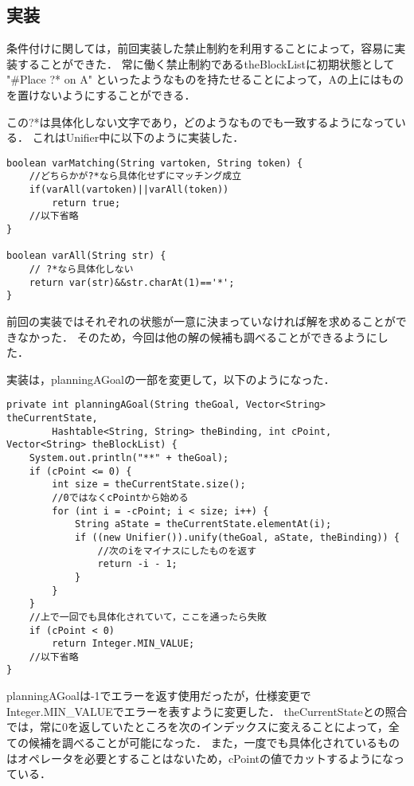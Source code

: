 \documentclass{jarticle}
\begin{document}
\subsection{実装}
条件付けに関しては，前回実装した禁止制約を利用することによって，容易に実装することができた．
常に働く禁止制約であるtheBlockListに初期状態として
"\#Place ?* on A"
といったようなものを持たせることによって，Aの上にはものを置けないようにすることができる．

この?*は具体化しない文字であり，どのようなものでも一致するようになっている．
これはUnifier中に以下のように実装した．

\begin{lstlisting}[caption=具体化しない変数の実装,label=src:unifier]
boolean varMatching(String vartoken, String token) {
    //どちらかが?*なら具体化せずにマッチング成立
    if(varAll(vartoken)||varAll(token))
        return true;
    //以下省略
}

boolean varAll(String str) {
    // ?*なら具体化しない
    return var(str)&&str.charAt(1)=='*';
}
\end{lstlisting}

前回の実装ではそれぞれの状態が一意に決まっていなければ解を求めることができなかった．
そのため，今回は他の解の候補も調べることができるようにした．

実装は，planningAGoalの一部を変更して，以下のようになった．

\begin{lstlisting}[caption=他の具体化も調べる,label=src:planagoal]
private int planningAGoal(String theGoal, Vector<String> theCurrentState,
        Hashtable<String, String> theBinding, int cPoint, Vector<String> theBlockList) {
    System.out.println("**" + theGoal);
    if (cPoint <= 0) {
        int size = theCurrentState.size();
        //0ではなくcPointから始める
        for (int i = -cPoint; i < size; i++) {
            String aState = theCurrentState.elementAt(i);
            if ((new Unifier()).unify(theGoal, aState, theBinding)) {
                //次のiをマイナスにしたものを返す
                return -i - 1;
            }
        }
    }
    //上で一回でも具体化されていて，ここを通ったら失敗
    if (cPoint < 0)
        return Integer.MIN_VALUE;
    //以下省略
}
\end{lstlisting}

planningAGoalは-1でエラーを返す使用だったが，仕様変更でInteger.MIN\_VALUEでエラーを表すように変更した．
theCurrentStateとの照合では，常に0を返していたところを次のインデックスに変えることによって，全ての候補を調べることが可能になった．
また，一度でも具体化されているものはオペレータを必要とすることはないため，cPointの値でカットするようになっている．
\newline
\end{document}
